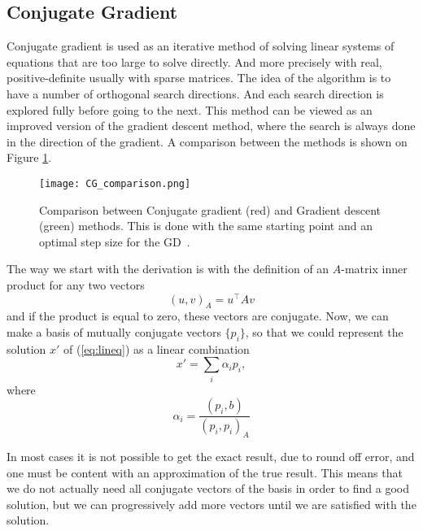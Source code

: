 \subsection{Conjugate Gradient}

Conjugate gradient is used as an iterative method of solving linear systems of equations that are too large to solve directly. And more precisely with real,  positive-definite usually with sparse matrices. The idea of the algorithm is to have a number of orthogonal search directions. And each search direction is explored fully before going to the next. This method can be viewed as an improved version of the gradient descent method, where the search is always done in the direction of the gradient. A comparison between the methods is shown on Figure \ref{fig:cg_comp}.
\begin{figure}[htbp]
    \centerline{\texttt{[image: CG\_comparison.png]}}
    \caption{Comparison between Conjugate gradient (red) and Gradient descent (green) methods. This is done with the same starting point and an optimal step size for the GD~\cite{pic-cg}.}
    \label{fig:cg_comp}
\end{figure}

The way we start with the derivation is with the definition of an $A$-matrix inner product for any two vectors
\begin{equation}
    \left( u, v \right)_A = u^\top A v
    \label{eq:cg_constraint}
\end{equation}
and if the product is equal to zero, these vectors are conjugate. Now, we can make a basis of mutually conjugate vectors $\{ p_i \}$, so that we could represent the solution $x'$ of (\ref{eq:lineq}) as a linear combination
\begin{equation}
    x' = \sum_i \alpha_i p_i,
\end{equation}
where
\begin{equation}
    \alpha_i = \frac{\left( p_i, b \right)}{\left( p_i, p_i \right)_A}
\end{equation}

In most cases it is not possible to get the exact result, due to round off error, and one must be content with an approximation of the true result. This means that we do not actually need all conjugate vectors of the basis in order to find a good solution, but we can progressively add more vectors until we are satisfied with the solution.

